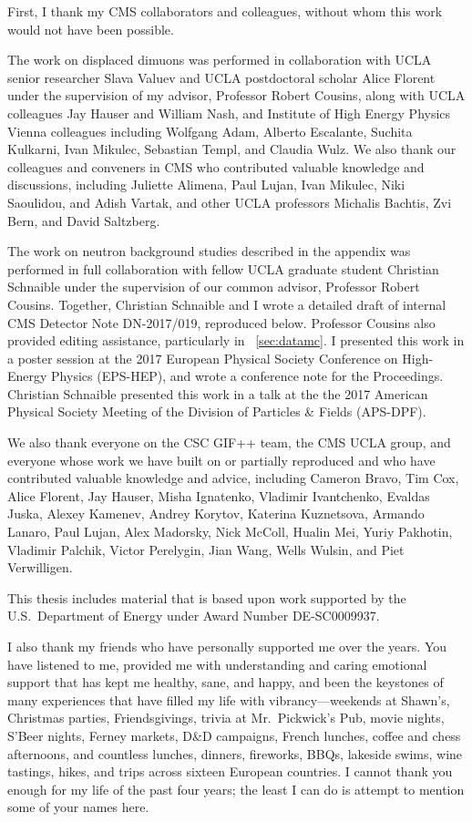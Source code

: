 First, I thank my CMS collaborators and colleagues, without whom this work would not have been possible.

The work on displaced dimuons was performed in collaboration with UCLA senior researcher Slava Valuev and UCLA postdoctoral scholar Alice Florent under the supervision of my advisor, Professor Robert Cousins, along with UCLA colleagues Jay Hauser and William Nash, and Institute of High Energy Physics Vienna colleagues including Wolfgang Adam, Alberto Escalante, Suchita Kulkarni, Ivan Mikulec, Sebastian Templ, and Claudia Wulz.
We also thank our colleagues and conveners in CMS who contributed valuable knowledge and discussions, including Juliette Alimena, Paul Lujan, Ivan Mikulec, Niki Saoulidou, and Adish Vartak, and other UCLA professors Michalis Bachtis, Zvi Bern, and David Saltzberg.

The work on neutron background studies described in the appendix was performed in full collaboration with fellow UCLA graduate student Christian Schnaible under the supervision of our common advisor, Professor Robert Cousins.
Together, Christian Schnaible and I wrote a detailed draft of internal CMS Detector Note DN-2017/019, reproduced below.
Professor Cousins also provided editing assistance, particularly in \Sec~\ref{sec:datamc}.
I presented this work in a poster session at the 2017 European Physical Society Conference on High-Energy Physics (EPS-HEP), and wrote a conference note for the Proceedings.
Christian Schnaible presented this work in a talk at the the 2017 American Physical Society Meeting of the Division of Particles \& Fields (APS-DPF).

We also thank everyone on the CSC GIF++ team, the CMS UCLA group, and everyone whose work we have built on or partially reproduced and who have contributed valuable knowledge and advice, including Cameron Bravo, Tim Cox, Alice Florent, Jay Hauser, Misha Ignatenko, Vladimir Ivantchenko, Evaldas Juska, Alexey Kamenev, Andrey Korytov, \mbox{Katerina} Kuznetsova, Armando Lanaro, Paul Lujan, Alex Madorsky, Nick McColl, Hualin Mei, Yuriy Pakhotin, Vladimir Palchik, Victor Perelygin, Jian Wang, Wells Wulsin, and Piet Verwilligen.

This thesis includes material that is based upon work supported by the U.S.\ Department of Energy under Award Number {DE}-{SC}0009937.

I also thank my friends who have personally supported me over the years.
You have listened to me, provided me with understanding and caring emotional support that has kept me healthy, sane, and happy, and been the keystones of many experiences that have filled my life with vibrancy---weekends at Shawn's, Christmas parties, Friendsgivings, trivia at Mr.\ Pickwick's Pub, movie nights, S'Beer nights, Ferney markets, D\&D campaigns, French lunches, coffee and chess afternoons, and countless lunches, dinners, fireworks, BBQs, lakeside swims, wine tastings, hikes, and trips across sixteen European countries.
I cannot thank you enough for my life of the past four years; the least I can do is attempt to mention some of your names here.

